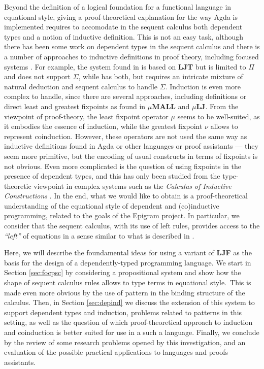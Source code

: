 \documentclass[creativecommons]{eptcs/eptcs}
\newcommand{\LJT}{\textbf{{LJT}}\xspace}
\newcommand{\LJF}{\textbf{{LJF}}\xspace}
\newcommand{\muLJ}{\textbf{{$\mu$LJ}}\xspace}
\newcommand{\muMALL}{\textbf{{$\mu$MALL}}\xspace}
\begin{document}
Beyond the definition of a logical foundation for a functional language in
equational style, giving a proof-theoretical explanation for the way Agda
is implemented requires to accomodate in the sequent calculus both dependent
types and a notion of inductive definition. This is not an easy task, although
there has been some work on dependent types in the sequent calculus
\cite{dyckhoff:lengrand:mckinna:11:focpts} and there is a number of
approaches to inductive definitions in proof theory, including focused
systems \cite{baelde:12:mumall}. For example, the system found in
\cite{dyckhoff:lengrand:mckinna:11:focpts} is based on \LJT but is limited
to $\Pi$ and does not support $\Sigma$, while \cite{dyckhoff:pinto:98:seqdep}
has both, but requires an intricate mixture of natural deduction and sequent
calculus to handle $\Sigma$. Induction is even more complex
to handle, since there are several approaches, including
definitions \cite{schroeder-heister:93:defr} or direct least and
greatest fixpoints as found in \muMALL \cite{baelde:12:mumall} and
\muLJ \cite{baelde:phd}. From the viewpoint of proof-theory, the least
fixpoint operator $\mu$ seems to be well-suited, as it embodies
the essence of induction, while the greatest fixpoint $\nu$ allows to
represent coinduction. However, these operators are not used the same way
as inductive definitions found in Agda or other languages or proof assistants
--- they seem more primitive, but the encoding of usual constructs in terms
of fixpoints is not obvious. Even more complicated is the question of using
fixpoints in the presence of dependent types, and this has only been studied
from the type-theoretic viewpoint in complex systems such as the \emph{Calculus
of Inductive Constructions} \cite{coquand:paulin:88:cic}. In the end, what
we would like to obtain is a proof-theoretical understanding of the
equational style of dependent and (co)inductive programming, related to the
goals of the Epigram project. In particular, we consider that the sequent
calculus, with its use of left rules, provides access to the
\emph{``left''} of equations in a sense similar to what is
described in \cite{mcbride:mckinna:04:left}.

Here, we will describe the foundamental ideas for using a variant of \LJF
as the basis for the design of a dependently-typed programming language.
We start in Section \ref{sec:focpsc} by considering a propositional system
and show how the shape of sequent calculus rules allows to type terms in
equational style.~This is made even more obvious by the use of pattern
in the binding structure of the calculus. Then, in Section \ref{sec:depind}
we discuss the extension of this system to support dependent types and
induction, problems related to patterns in this setting, as well as the
question of which proof-theoretical approach to induction and coinduction
is better suited for use in a such a language. Finally, we conclude by
the review of some research problems opened by this investigation, and
an evaluation of the possible practical applications to languages and
proofs assistants.
\end{document}

